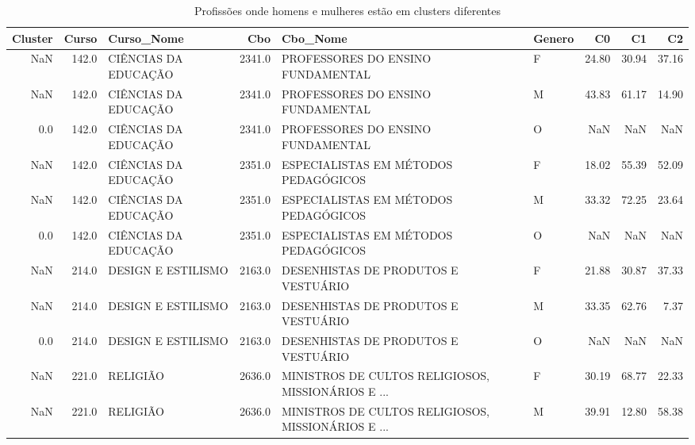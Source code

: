 \begin{table}
\centering
\caption{Profissões onde homens e mulheres estão em clusters diferentes}
\label{tab:Clusters_Diferentes}
\begin{tabular}{rrlrllrrr}
\toprule
 Cluster &  Curso &                            Curso\_Nome &    Cbo &                                           Cbo\_Nome & Genero &    C0 &    C1 &    C2 \\
\midrule
     NaN &  142.0 &                  CIÊNCIAS DA EDUCAÇÃO & 2341.0 &                  PROFESSORES DO ENSINO FUNDAMENTAL &      F & 24.80 & 30.94 & 37.16 \\
     NaN &  142.0 &                  CIÊNCIAS DA EDUCAÇÃO & 2341.0 &                  PROFESSORES DO ENSINO FUNDAMENTAL &      M & 43.83 & 61.17 & 14.90 \\
     0.0 &  142.0 &                  CIÊNCIAS DA EDUCAÇÃO & 2341.0 &                  PROFESSORES DO ENSINO FUNDAMENTAL &      O &   NaN &   NaN &   NaN \\
     NaN &  142.0 &                  CIÊNCIAS DA EDUCAÇÃO & 2351.0 &               ESPECIALISTAS EM MÉTODOS PEDAGÓGICOS &      F & 18.02 & 55.39 & 52.09 \\
     NaN &  142.0 &                  CIÊNCIAS DA EDUCAÇÃO & 2351.0 &               ESPECIALISTAS EM MÉTODOS PEDAGÓGICOS &      M & 33.32 & 72.25 & 23.64 \\
     0.0 &  142.0 &                  CIÊNCIAS DA EDUCAÇÃO & 2351.0 &               ESPECIALISTAS EM MÉTODOS PEDAGÓGICOS &      O &   NaN &   NaN &   NaN \\
     NaN &  214.0 &                    DESIGN E ESTILISMO & 2163.0 &               DESENHISTAS DE PRODUTOS E  VESTUÁRIO &      F & 21.88 & 30.87 & 37.33 \\
     NaN &  214.0 &                    DESIGN E ESTILISMO & 2163.0 &               DESENHISTAS DE PRODUTOS E  VESTUÁRIO &      M & 33.35 & 62.76 &  7.37 \\
     0.0 &  214.0 &                    DESIGN E ESTILISMO & 2163.0 &               DESENHISTAS DE PRODUTOS E  VESTUÁRIO &      O &   NaN &   NaN &   NaN \\
     NaN &  221.0 &                              RELIGIÃO & 2636.0 & MINISTROS DE CULTOS RELIGIOSOS, MISSIONÁRIOS E ... &      F & 30.19 & 68.77 & 22.33 \\
     NaN &  221.0 &                              RELIGIÃO & 2636.0 & MINISTROS DE CULTOS RELIGIOSOS, MISSIONÁRIOS E ... &      M & 39.91 & 12.80 & 58.38 \\

\end{tabular}
\end{table}
